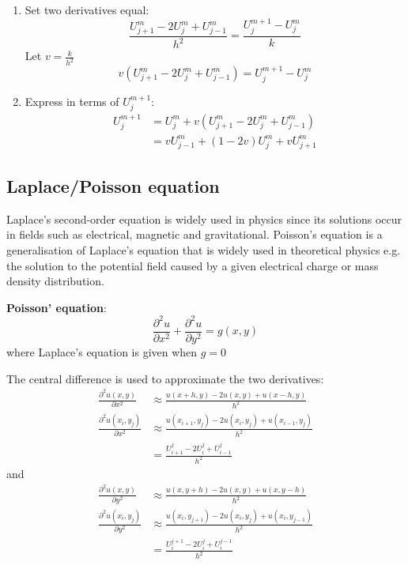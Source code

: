 \documentclass[10pt,a4paper]{article}
\begin{document}
\begin{enumerate}
    \item Set two derivatives equal:
    $$
        \frac{U_{j+1}^m - 2U_j^m + U_{j-1}^m}{h^2} = \frac{U_j^{m+1}-U_j^m}{k}
    $$
    Let $v=\frac{k}{h^2}$
    $$
        v\left(U_{j+1}^m - 2U_j^m + U_{j-1}^m\right) = U_j^{m+1} - U_j^m
    $$

    \item Express in terms of $U_j^{m+1}$:
    \begin{align*}
        U_j^{m+1} &= U_j^m + v\left(U_{j+1}^m - 2U_j^m + U_{j-1}^m\right) \\
        &= vU_{j-1}^m + (1-2v)U_j^m + vU_{j+1}^m
    \end{align*}
\end{enumerate}

\subsection{Laplace/Poisson equation}

Laplace's second-order equation is widely used in physics since its solutions occur in fields such
as electrical, magnetic and gravitational. Poisson's equation is a generalisation of Laplace's
equation that is widely used in theoretical physics e.g. the solution to the potential field caused
by a given electrical charge or mass density distribution. \par 

\begin{tcolorbox}[breakable,colback=white,colframe=black,width=\dimexpr\textwidth+12mm\relax,enlarge left by=-6mm]
\textbf{Poisson' equation}: 
$$
    \frac{\partial^2 u}{\partial x^2} + \frac{\partial^2 u}{\partial y^2} = g(x,y)
$$
where Laplace's equation is given when $g=0$ 
\end{tcolorbox}

The central difference is used to approximate the two derivatives:
\begin{align*}
    \frac{\partial ^2 u(x,y)}{\partial x^2} &\approx \frac{u(x+h,y)-2u(x,y)+u(x-h,y)}{h^2} \\
    \frac{\partial^2u(x_i,y_j)}{\partial x^2} &\approx \frac{u(x_{i+1},y_j)-2u(x_i,y_j)+u(x_{i-1},y_j)}{h^2} \\
    &= \frac{U_{i+1}^j - 2U_i^j + U_{i-1}^j}{h^2}
\end{align*}
and
\begin{align*}
    \frac{\partial ^2 u(x,y)}{\partial y^2} &\approx \frac{u(x,y+h)-2u(x,y)+u(x,y-h)}{h^2} \\
    \frac{\partial^2u(x_i,y_j)}{\partial y^2} &\approx \frac{u(x_{i},y_{j+1})-2u(x_i,y_j)+u(x_{i},y_{j-1})}{h^2} \\
    &= \frac{U_{i}^{j+1} - 2U_i^j + U_{i}^{j-1}}{h^2}
\end{align*}
\end{document}
